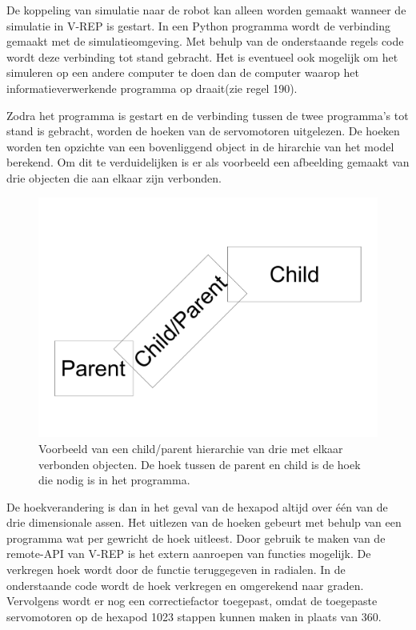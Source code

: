 \documentclass[10pt,a4paper]{article}
\begin{document}
De koppeling van simulatie naar de robot kan alleen worden gemaakt wanneer de simulatie in V-REP is gestart. In een Python programma wordt de verbinding gemaakt met de simulatieomgeving. Met behulp van de onderstaande regels code wordt deze verbinding tot stand gebracht. Het is eventueel ook mogelijk om het simuleren op een andere computer te doen dan de computer waarop het informatieverwerkende programma op draait(zie regel 190).



Zodra het programma is gestart en de verbinding tussen de twee programma's tot stand is gebracht, worden de hoeken van de servomotoren uitgelezen. De hoeken worden ten opzichte van een bovenliggend object in de hirarchie van het model berekend. Om dit te verduidelijken is er als voorbeeld een afbeelding gemaakt van drie objecten die aan elkaar zijn verbonden.

\begin{figure}[h]
    \centering
    \includegraphics[width=1\textwidth]{hierarchi}
    \caption{Voorbeeld van een child/parent hierarchie van drie met elkaar verbonden objecten. De hoek tussen de parent en child is de hoek die nodig is in het programma.}
    \label{fig:hierarchi}
\end{figure}

De hoekverandering is dan in het geval van de hexapod altijd over \'e\'en van de drie dimensionale assen. Het uitlezen van de hoeken gebeurt met behulp van een programma wat per gewricht de hoek uitleest. Door gebruik te maken van de remote-API van V-REP is het extern aanroepen van functies mogelijk. De verkregen hoek wordt door de functie teruggegeven in radialen. In de onderstaande code wordt de hoek verkregen en omgerekend naar graden. Vervolgens wordt er nog een correctiefactor toegepast, omdat de toegepaste servomotoren op de hexapod 1023 stappen kunnen maken in plaats van 360.
\end{document}
